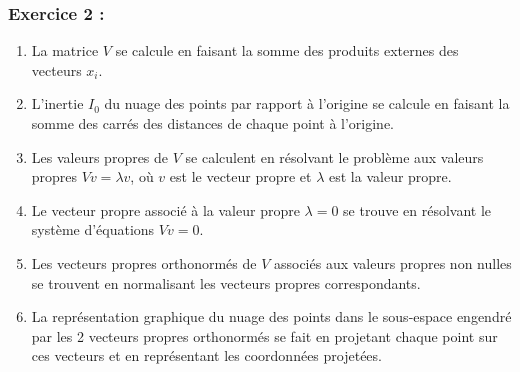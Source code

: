 \documentclass{article}
\begin{document}
\subsubsection*{Exercice 2 :}

\begin{enumerate}
    \item La matrice \( V \) se calcule en faisant la somme des produits externes des vecteurs \( x_i \).
    
    \item L'inertie \( I_0 \) du nuage des points par rapport à l’origine se calcule en faisant la somme des carrés des distances de chaque point à l'origine.
    
    \item Les valeurs propres de \( V \) se calculent en résolvant le problème aux valeurs propres \( Vv = \lambda v \), où \( v \) est le vecteur propre et \( \lambda \) est la valeur propre.
    
    \item Le vecteur propre associé à la valeur propre \( \lambda = 0 \) se trouve en résolvant le système d'équations \( Vv = 0 \).
    
    \item Les vecteurs propres orthonormés de \( V \) associés aux valeurs propres non nulles se trouvent en normalisant les vecteurs propres correspondants.
    
    \item La représentation graphique du nuage des points dans le sous-espace engendré par les 2 vecteurs propres orthonormés se fait en projetant chaque point sur ces vecteurs et en représentant les coordonnées projetées.
\end{enumerate}
\end{document}
